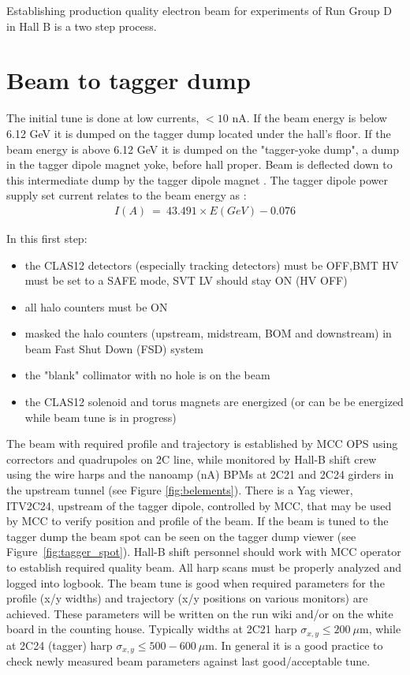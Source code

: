 \indent

Establishing production quality electron beam for experiments of Run Group D in Hall B is a two step process. 

\section{Beam to tagger  dump}
\indent

The initial tune is done at low currents, $<10$ nA. If the beam energy is below 6.12 GeV it is dumped on the tagger dump located under the hall's floor. If the beam energy is above 6.12 GeV  it is dumped on the "tagger-yoke dump", a dump in the tagger dipole magnet yoke, before hall proper. Beam is deflected down to this intermediate dump by the tagger dipole magnet \cite{tagger}. The tagger dipole power supply set current relates to the beam energy as \cite{yokedump}:
\begin{eqnarray}
I(A)~=~43.491\times E(GeV)-0.076
\end{eqnarray}


In this first step:
\begin{itemize}
\item the CLAS12 detectors (especially tracking detectors) must be OFF,BMT HV must be set to a SAFE mode, SVT LV should stay ON (HV OFF)
\item all halo counters must be ON
\item masked the halo counters (upstream, midstream, BOM and downstream) in beam Fast Shut Down (FSD) system 
\item the "blank" collimator with no hole is on the beam
\item the CLAS12 solenoid and torus magnets are energized (or can be be energized while beam tune is in progress)
\end{itemize}

The beam with required profile and trajectory is established by MCC OPS using correctors and quadrupoles on 2C line, while monitored by Hall-B shift crew using the wire harps and the nanoamp (nA) BPMs \cite{nA_BPM} at 2C21 and 2C24 girders in the upstream tunnel (see  Figure \ref{fig:belements}). There is a Yag viewer, ITV2C24, upstream of the tagger dipole, controlled by MCC, that may be used by MCC to verify position and profile of the beam. If the beam is tuned to the tagger dump the beam spot can be seen on the tagger dump viewer (see Figure~\ref{fig:tagger_spot}). 
Hall-B shift personnel should work with MCC operator to establish required quality beam. All harp scans must be properly analyzed and logged into logbook. The beam tune is good when required parameters for the profile (x/y widths) and trajectory (x/y positions on various monitors) are achieved. These parameters will be written on the run wiki and/or on the white board in the counting house. Typically widths at 2C21 harp $\sigma_{x,y}\le 200~\mu$m, while at 2C24 (tagger) harp $\sigma_{x,y}\le 500-600~\mu$m. In general it is a good practice to check newly measured beam parameters against last good/acceptable tune.  

